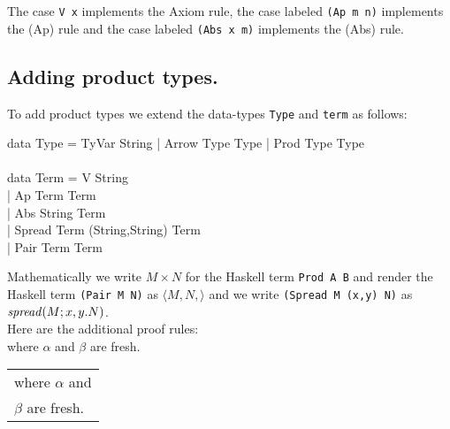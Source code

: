 \documentclass[11pt]{article}
\begin{document}
The case {\tt{V x}} implements the Axiom rule, the case labeled {\tt{(Ap m
n)}} implements the (Ap) rule and the case labeled {\tt{(Abs x m)}} implements
the (Abs) rule.


\subsection{Adding product types.}

To add product types  we extend the data-types {\tt{Type}} and {\tt{term}} as follows:

\begin{program*}
\>   data Type = TyVar String | Arrow Type Type | Prod Type Type \\
\> \\
\>  data Term = V String \\
\>            | Ap Term Term \\
\>            | Abs String Term \\
\>            | Spread Term (String,String) Term \\
\>            | Pair Term Term\\
\end{program*}

  Mathematically we write $M\times{}N$ for the Haskell term {\tt{Prod A B}} and
render the Haskell term {\tt{(Pair M N)}} as $\langle{}M,N,\rangle$ and we
write {\tt{(Spread M (x,y) N)}} as ${\mathit{spread}({M};{x,y}.{N})}$.
\ \\
Here are the additional proof rules:
\vspace{.125in}\\

{\hspace{.25in}} where $\alpha$ and $\beta$ are fresh.
\vspace{.125in}\\

{\hspace{.25in}}
\begin{tabular}{l}
 where $\alpha$ and \\
 $\beta$ are fresh.
\end{tabular}
\vspace{.125in}\\
\end{document}
